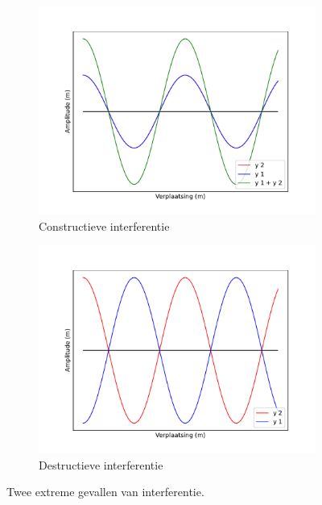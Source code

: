 \documentclass[a4paper,kul]{kulakarticle} %
\begin{document}
\begin{figure}[h]
	\centering
	\begin{subfigure}{.5\textwidth}
		\centering
		\includegraphics[width=1\linewidth]{constructieve_interferentie}
		\caption{Constructieve interferentie}
		\label{fig:constructief}
	\end{subfigure}%
	\begin{subfigure}{.5\textwidth}
		\centering
		\includegraphics[width=1\linewidth]{destructieve_interferentie}
		\caption{Destructieve interferentie}
		\label{fig:destructief}
	\end{subfigure}
	\caption{Twee extreme gevallen van interferentie.}
	\label{fig:omegaVZ}
\end{figure}\\
\end{document}

